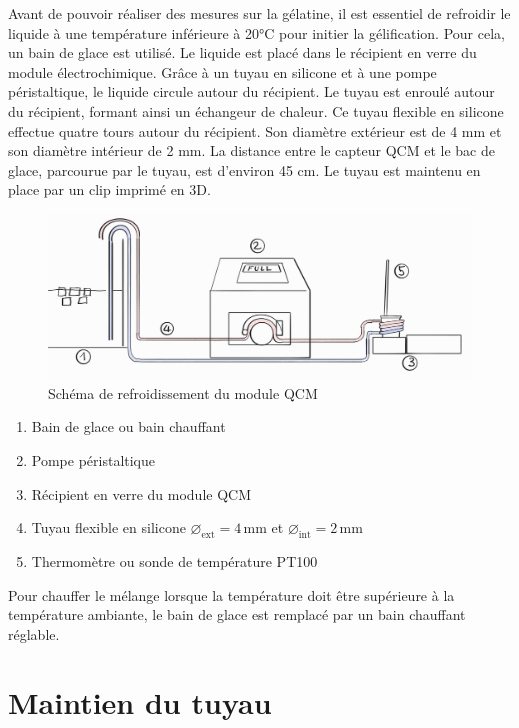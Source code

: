 Avant de pouvoir réaliser des mesures sur la gélatine, il est essentiel de refroidir le liquide à une température inférieure à 20°C pour initier la gélification.  
Pour cela, un bain de glace est utilisé. Le liquide est placé dans le récipient en verre du module électrochimique.  
Grâce à un tuyau en silicone et à une pompe péristaltique, le liquide circule autour du récipient.  
Le tuyau est enroulé autour du récipient, formant ainsi un échangeur de chaleur.  
Ce tuyau flexible en silicone effectue quatre tours autour du récipient. Son diamètre extérieur est de 4 mm et son diamètre intérieur de 2 mm. La distance entre le capteur QCM et le bac de glace, parcourue par le tuyau, est d’environ 45 cm.
Le tuyau est maintenu en place par un clip imprimé en 3D.

\begin{figure}[H]
    \centering
    \includegraphics[width=\textwidth]{assets/figures/Pump TB.png}
    \caption{Schéma de refroidissement du module QCM}
    \label{fig:Shema_glacière}
\end{figure}

\begin{enumerate}
    \item Bain de glace ou bain chauffant
    \item Pompe péristaltique
    \item Récipient en verre du module QCM
    \item Tuyau flexible en silicone  $\varnothing_\text{ext} = 4\,\mathrm{mm}$ et $\varnothing_\text{int} = 2\,\mathrm{mm}$
    \item Thermomètre ou sonde de température PT100
\end{enumerate}

Pour chauffer le mélange lorsque la température doit être supérieure à la température ambiante, le bain de glace est remplacé par un bain chauffant réglable.

\section{Maintien du tuyau}

